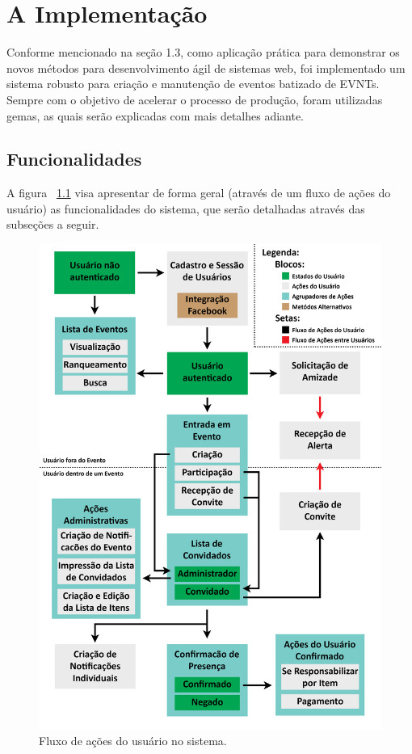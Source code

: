 \chapter{A Implementação}

Conforme mencionado na seção 1.3, como aplicação prática para demonstrar os novos métodos para desenvolvimento ágil de sistemas web, foi implementado um sistema robusto para criação e manutenção de eventos batizado de EVNTs. Sempre com o objetivo de acelerar o processo de produção, foram utilizadas gemas, as quais serão explicadas com mais detalhes adiante.

\section{Funcionalidades}

A figura ~\ref{fig:esquemaapp} visa apresentar de forma geral (através de um fluxo de ações do usuário) as funcionalidades do sistema, que serão detalhadas através das subseções a seguir.

\begin{figure}[H]
\centering
\includegraphics[width=1\textwidth]{figs/esquema_app}
\caption[\textit{Fluxo de ações do usuário no sistema}.]
{Fluxo de ações do usuário no sistema.}
\label{fig:esquemaapp}
\end{figure}

